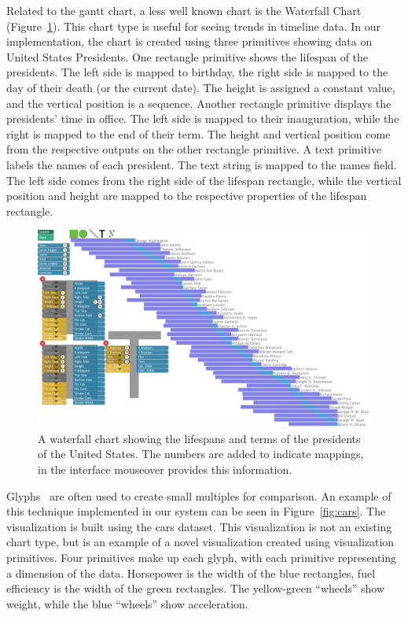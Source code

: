 Related to the gantt chart, a less well known chart is the Waterfall Chart (Figure~\ref{fig:presidents}).
This chart type is useful for seeing trends in timeline data.
In our implementation, the chart is created using three primitives showing data on United States Presidents.
One rectangle primitive shows the lifespan of the presidents.
The left side is mapped to birthday, the right side is mapped to the day of their death (or the current date).
The height is assigned a constant value, and the vertical position is a sequence.
Another rectangle primitive displays the presidents' time in office.
The left side is mapped to their inauguration, while the right is mapped to the end of their term.
The height and vertical position come from the respective outputs on the other rectangle primitive.
A text primitive labels the names of each president.
The text string is mapped to the names field.
The left side comes from the right side of the lifespan rectangle, while the vertical position and height are mapped to the respective properties of the lifespan rectangle.
\begin{figure}[t]
   \centering
   \includegraphics[width=\textwidth]{images/presidents}
   \caption{
   A waterfall chart showing the lifespans and terms of the presidents of the United States.
   The numbers are added to indicate mappings, in the interface mouseover provides this information.
}
   \label{fig:presidents}
\end{figure}

\label{glyphs}

Glyphs~\cite{Horn1998} are often used to create small multiples for comparison.
An example of this technique implemented in our system can be seen in Figure~\ref{fig:cars}.
The visualization is built using the cars dataset.
This visualization is not an existing chart type, but is an example of a novel visualization created using visualization primitives.
Four primitives make up each glyph, with each primitive representing a dimension of the data.
Horsepower is the width of the blue rectangles, fuel efficiency is the width of the green rectangles.
The yellow-green ``wheels'' show weight, while the blue ``wheels'' show acceleration.

